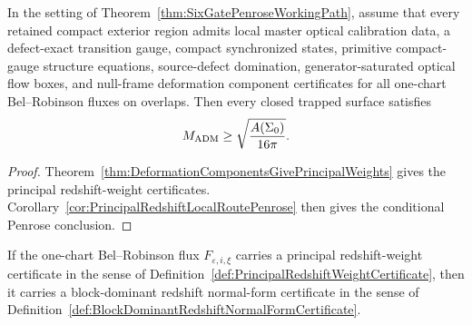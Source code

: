 \begin{corollary}\label{cor:ComponentDeformationLocalRoutePenrose}
In the setting of Theorem~\ref{thm:SixGatePenroseWorkingPath}, assume that every
retained compact exterior region admits local master optical calibration data, a
defect-exact transition gauge, compact synchronized states, primitive
compact-gauge structure equations, source-defect domination, generator-saturated
optical flow boxes, and null-frame deformation component certificates for all
one-chart Bel--Robinson fluxes on overlaps. Then every closed trapped surface
satisfies
\[
    M_{\mathrm{ADM}}\ge \sqrt{\frac{A(\Sigma_0)}{16\pi}} .
\]
\end{corollary}

\begin{proof}
Theorem~\ref{thm:DeformationComponentsGivePrincipalWeights} gives the principal
redshift-weight certificates.  Corollary~\ref{cor:PrincipalRedshiftLocalRoutePenrose}
then gives the conditional Penrose conclusion.
\end{proof}

\begin{theorem}\label{thm:PrincipalRedshiftWeightsGiveBlockDominance}
If the one-chart Bel--Robinson flux $F_{\varepsilon,i,\xi}$ carries a principal
redshift-weight certificate in the sense of
Definition~\ref{def:PrincipalRedshiftWeightCertificate}, then it carries a
block-dominant redshift normal-form certificate in the sense of
Definition~\ref{def:BlockDominantRedshiftNormalFormCertificate}.
\end{theorem}


